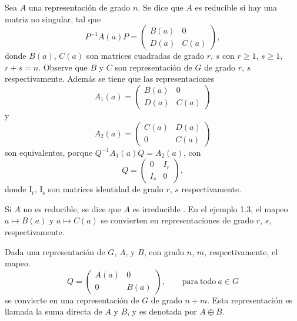 \documentclass[12pt]{book}
\theoremstyle{definition}
\newcounter{in}
\begin{document}
Sea $A$ una representación de grado $n$. Se dice que $A$ es reducible
si hay una matriz no singular, tal que
\begin{equation*}
  P^{-1}A\left(a\right)P=
  \begin{pmatrix}
    B\left(a\right) & 0 \\
    D\left(a\right) & C\left(a\right)
  \end{pmatrix}, 
\end{equation*}  
donde $B\left(a\right)$, $C\left(a\right)$ son matrices cuadradas de
grado $r$, $s$ con $r \geq 1$, $s \geq 1$, $r+s=n$. Observe que $B$ y
$C$ son representación de $G$ de grado $r$, $s$
respectivamente. Además se tiene que las representaciones
\begin{equation*}
  A_{1}\left(a\right)=
  \begin{pmatrix}
    B\left(a\right) & 0 \\
    D\left(a\right) & C\left(a\right)
  \end{pmatrix}
\end{equation*}
y
\begin{equation*} 
   A_{2}\left(a\right)=
  \begin{pmatrix}
    C\left(a\right) & D\left(a\right) \\
    0 & C\left(a\right)
  \end{pmatrix}
\end{equation*}
son equivalentes, porque
$Q^{-1}A_{1}\left(a\right)Q=A_{2}\left(a\right)$, con
\begin{equation*}
  Q=
  \begin{pmatrix}
    0 & I_{r} \\ 
    I_{s} & 0
  \end{pmatrix},
\end{equation*}
donde $ \mathrm{I_{r}}$, $ \mathrm{I_{s}}$ son matrices identidad de
grado $r$, $s$ respectivamente.

Si $A$ no es reducible, se dice que $A$ es irreducible . En el ejemplo
1.3, el mapeo $a \mapsto B\left(a\right)$ y
$a \mapsto C\left(a\right)$ se convierten en representaciones de grado
$r$, $s$, respectivamente.

Dada una representación de $G$, $A$, y $B$, con grado $n$, $m$,
respectivamente, el mapeo.
\begin{equation*}
  Q=
  \begin{pmatrix}
    A\left(a\right) & 0 \\ 
    0 & B\left(a\right)
  \end{pmatrix}, \qquad \mathrm{para\ todo\ } a \in G
\end{equation*}
se convierte en una representación de $G$ de grado $n+m$. Esta
representación es llamada la suma directa de $A$ y
$B$, y es denotada por $A \oplus B$.
\end{document}
